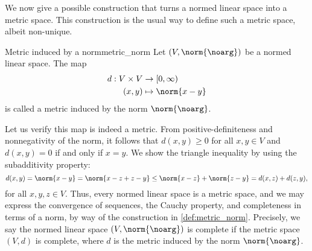 We now give a possible construction that turns a normed linear space into a metric space. This construction is the usual way to define such a metric space, albeit non-unique.
\begin{definition}{Metric induced by a norm}{metric_norm}
    Let \((V, \norm{\noarg})\) be a normed linear space. The map
    \begin{align*}
        d : V \times V &\to [0, \infty)\\
        (x,y) &\mapsto \norm{x - y}
    \end{align*}
    is called a metric induced by the norm \(\norm{\noarg}\).
\end{definition}
Let us verify this map is indeed a metric. From positive-definiteness and nonnegativity of the norm, it follows that \(d(x, y) \geq 0\) for all \(x,y \in V\) and \(d(x,y) = 0\) if and only if \(x = y\). We show the triangle inequality by using the subadditivity property:
\begin{equation*}
    d(x,y) = \norm{x - y} = \norm{x - z + z - y} \leq \norm{x - z} + \norm{z - y} = d(x,z) + d(z, y),
\end{equation*}
for all \(x,y,z \in V\). Thus, every normed linear space is a metric space, and we may express the convergence of sequences, the Cauchy property, and completeness in terms of a norm, by way of the construction in \cref{def:metric_norm}. Precisely, we say the normed linear space \((V, \norm{\noarg})\) is complete if the metric space \((V,d)\) is complete, where \(d\) is the metric induced by the norm \(\norm{\noarg}\).

